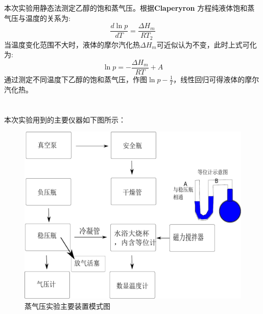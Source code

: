 \documentclass[10.5pt]{ctexart}
\begin{document}
\title{\textbf{}} %
\author{}
\date{}
\maketitle
\section{\textbf{}}
本次实验用静态法测定乙醇的饱和蒸气压。根据\textbf{Claperyron} 方程纯液体饱和蒸气压与温度的关系为:
\begin{equation}
\frac{d \ln p}{dT}=\frac{\Delta H_m}{RT_2}
\end{equation}
当温度变化范围不大时，液体的摩尔汽化热$\Delta H_m$可近似认为不变，此时上式可化为:
\begin{equation}
\ln p=-\frac{\Delta H_m}{RT}+A
\end{equation}
通过测定不同温度下乙醇的饱和蒸气压，作图$\ln p-\frac{1}{T}$，线性回归可得液体的摩尔汽化热。
\section{\textbf{}}
\subsection{\textbf{}}
本次实验用到的主要仪器如下图所示：
\begin{figure}[!ht]
\centering
\caption{蒸气压实验主要装置模式图}
\includegraphics[width=350pt]{VaporTemperatureTest.pdf}
\end{figure}
\end{document}
